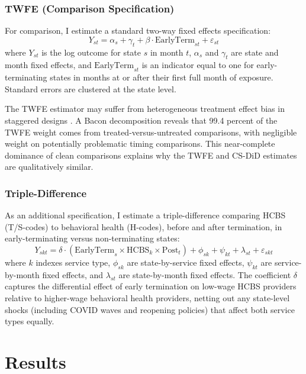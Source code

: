 \documentclass[12pt]{article}
\begin{document}
\subsubsection{TWFE (Comparison Specification)}

For comparison, I estimate a standard two-way fixed effects specification:
\begin{equation}
Y_{st} = \alpha_s + \gamma_t + \beta \cdot \text{EarlyTerm}_{st} + \varepsilon_{st}
\end{equation}
where $Y_{st}$ is the log outcome for state $s$ in month $t$, $\alpha_s$ and $\gamma_t$ are state and month fixed effects, and $\text{EarlyTerm}_{st}$ is an indicator equal to one for early-terminating states in months at or after their first full month of exposure. Standard errors are clustered at the state level.

The TWFE estimator may suffer from heterogeneous treatment effect bias in staggered designs \citep{goodman-bacon2021, dechaisemartin2020, sun2021}. A Bacon decomposition reveals that 99.4 percent of the TWFE weight comes from treated-versus-untreated comparisons, with negligible weight on potentially problematic timing comparisons. This near-complete dominance of clean comparisons explains why the TWFE and CS-DiD estimates are qualitatively similar.

\subsubsection{Triple-Difference}

As an additional specification, I estimate a triple-difference comparing HCBS (T/S-codes) to behavioral health (H-codes), before and after termination, in early-terminating versus non-terminating states:
\begin{equation}
Y_{skt} = \delta \cdot (\text{EarlyTerm}_s \times \text{HCBS}_k \times \text{Post}_t) + \phi_{sk} + \psi_{kt} + \lambda_{st} + \varepsilon_{skt}
\end{equation}
where $k$ indexes service type, $\phi_{sk}$ are state-by-service fixed effects, $\psi_{kt}$ are service-by-month fixed effects, and $\lambda_{st}$ are state-by-month fixed effects. The coefficient $\delta$ captures the differential effect of early termination on low-wage HCBS providers relative to higher-wage behavioral health providers, netting out any state-level shocks (including COVID waves and reopening policies) that affect both service types equally.


\section{Results}
\end{document}
